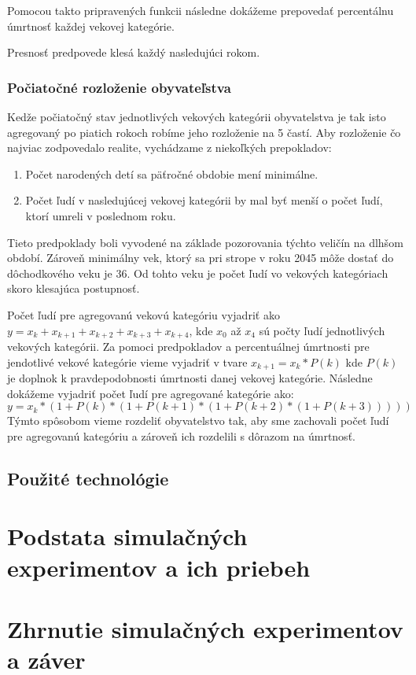 \documentclass[a4paper, 11pt]{article}
\begin{document}
Pomocou takto pripravených funkcii následne dokážeme prepovedať percentálnu úmrtnosť každej vekovej kategórie.

Presnosť predpovede klesá každý nasledujúci rokom.

\subsubsection*{Počiatočné rozloženie obyvateľstva}
Kedže počiatočný stav jednotlivých vekových kategórii obyvatelstva je tak isto agregovaný po piatich rokoch robíme jeho rozloženie na 5 častí. Aby rozloženie čo najviac zodpovedalo realite, vychádzame z niekoľkých prepokladov:
\begin{enumerate}
\item Počet narodených detí sa päťročné obdobie mení minimálne.
\item Počet ľudí v nasledujúcej vekovej kategórii by mal byť menší o počet ľudí, ktorí umreli v poslednom roku.
\end{enumerate}
Tieto predpoklady boli vyvodené na základe pozorovania týchto veličín na dlhšom období. Zároveň minimálny vek, ktorý sa pri strope v roku 2045 môže dostať do dôchodkového veku je 36. Od tohto veku je počet ľudí vo vekových kategóriach skoro klesajúca postupnosť.

Počet ľudí pre agregovanú vekovú kategóriu vyjadriť ako $y = x_{k} + x_{k+1} + x_{k+2} + x_{k+3} + x_{k+4}$, kde $x_0$ až $x_4$ sú počty ľudí jednotlivých vekových kategórii. Za pomoci predpokladov a percentuálnej úmrtnosti pre jendotlivé vekové kategórie vieme vyjadriť v tvare $x_{k+1}=x_{k}*P(k)$ kde $P(k)$ je doplnok k pravdepodobnosti úmrtnosti danej vekovej kategórie. Následne dokážeme vyjadriť počet ľudí pre agregované kategórie ako:
$$y = x_k*(1 + P(k)*(1 + P(k+1)*(1 + P(k+2) * (1 + P(k+3)))))$$
Týmto spôsobom vieme rozdeliť obyvatelstvo tak, aby sme zachovali počet ľudí pre agregovanú kategóriu a zároveň ich rozdelili s dôrazom na úmrtnosť.
\subsection{Použité technológie}


\section{Podstata simulačných experimentov a ich priebeh}

\section{Zhrnutie simulačných experimentov a záver}
\end{document}
